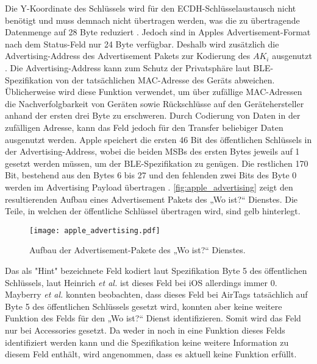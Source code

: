 Die Y-Koordinate des Schlüssels wird für den \ac{ECDH}-Schlüsselaustausch nicht benötigt und muss demnach nicht übertragen werden, was die zu übertragende Datenmenge auf 28 Byte reduziert \cite{Heinrich_FindMy}.
Jedoch sind in Apples Advertisement-Format nach dem Status-Feld nur 24 Byte verfügbar.
Deshalb  wird zusätzlich die Advertising-Address des Advertisement Pakets zur Kodierung des $AK_i$ ausgenutzt \cite{Heinrich_FindMy}.
Die Advertising-Address kann zum Schutz der Privatsphäre laut \ac{BLE}-Spezifikation \cite{Spec_BLE_5.3} von der tatsächlichen \ac{MAC}-Adresse des Geräts abweichen.
Üblicherweise wird diese Funktion verwendet, um über zufällige \ac{MAC}-Adressen die Nachverfolgbarkeit von Geräten sowie Rückschlüsse auf den Gerätehersteller anhand der ersten drei Byte zu erschweren.
Durch Codierung von Daten in der zufälligen Adresse, kann das Feld jedoch für den Transfer beliebiger Daten ausgenutzt werden.
Apple speichert die ersten 46 Bit des öffentlichen Schlüssels in der Advertising-Address, wobei die beiden \acp{MSB} des ersten Bytes jeweils auf 1 gesetzt werden müssen, um der \ac{BLE}-Spezifikation zu genügen.
Die restlichen 170 Bit, bestehend aus den Bytes 6 bis 27 und den fehlenden zwei Bits des Byte 0 werden im Advertising Payload übertragen \cite{Apple_FindMySpec,Heinrich_FindMy}.
\autoref{fig:apple_advertising} zeigt den resultierenden Aufbau eines Advertisement Pakets des „Wo ist?“ Dienstes.
Die Teile, in welchen der öffentliche Schlüssel übertragen wird, sind gelb hinterlegt.
\begin{figure}[ht]
    \centering
    \texttt{[image: apple\_advertising.pdf]}
    \caption{Aufbau der Advertisement-Pakete des „Wo ist?“ Dienstes.}
    \label{fig:apple_advertising}
\end{figure}
Das als "Hint" bezeichnete Feld kodiert laut Spezifikation \cite{Apple_FindMySpec} Byte 5 des öffentlichen Schlüssels, laut Heinrich \textit{et al.} \cite{Heinrich_FindMy} ist dieses Feld bei iOS allerdings immer 0.
Mayberry \textit{et al.} \cite{Mayberry_Tracking} konnten beobachten, dass dieses Feld bei AirTags tatsächlich auf Byte 5 des öffentlichen Schlüssels gesetzt wird, konnten aber keine weitere Funktion des Felds für den „Wo ist?“ Dienst identifizieren.
Somit wird das Feld nur bei Accessories gesetzt.
Da weder in \cite{Heinrich_FindMy} noch in \cite{Mayberry_Tracking} eine Funktion dieses Felds identifiziert werden kann und die Spezifikation \cite{Apple_FindMySpec} keine weitere Information zu diesem Feld enthält, wird angenommen, dass es aktuell keine Funktion erfüllt.


